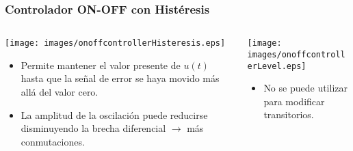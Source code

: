 \documentclass[aspectratio=169,handout]{beamer}
\theoremstyle{definition}
\theoremstyle{plain}
\theoremstyle{remark}
\begin{document}
\begin{frame}[<+->]\frametitle{Controlador ON-OFF con Histéresis}
\begin{columns}
  \begin{column}{0.5\textwidth}
    \vspace*{5mm}
    \texttt{[image: images/onoffcontrollerHisteresis.eps]}
    \vspace*{-5mm}
    \begin{itemize}
      \item Permite mantener el valor presente de $u(t)$ hasta que la señal de error se haya movido más allá del valor cero.
      \item La amplitud de la oscilación puede reducirse disminuyendo la brecha diferencial $\rightarrow$ más conmutaciones.
    \end{itemize}
  \end{column} 
  \begin{column}{0.5\textwidth}
    \begin{center}
    \texttt{[image: images/onoffcontrollerLevel.eps]}
    \end{center}
    \vspace*{-5mm}
    \begin{itemize}
      \item No se puede utilizar para modificar transitorios.
    \end{itemize}
  \end{column} 
\end{columns}
\end{frame}
\end{document}
